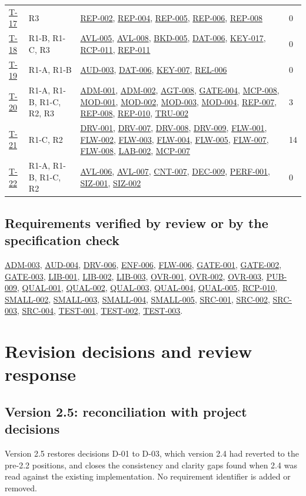 \documentclass[11pt,a4paper]{article}
\newcommand{\rr}[1]{\hyperlink{req:#1}{#1}}
\begin{document}
\begin{longtable}{@{}P{0.07\textwidth}P{0.10\textwidth}P{0.64\textwidth}P{0.08\textwidth}@{}}
\hyperlink{test:T-17}{T-17} & R3 & \rr{REP-002}, \rr{REP-004}, \rr{REP-005}, \rr{REP-006}, \rr{REP-008} & 0\\
\hyperlink{test:T-18}{T-18} & R1-B, R1-C, R3 & \rr{AVL-005}, \rr{AVL-008}, \rr{BKD-005}, \rr{DAT-006}, \rr{KEY-017}, \rr{RCP-011}, \rr{REP-011} & 0\\
\hyperlink{test:T-19}{T-19} & R1-A, R1-B & \rr{AUD-003}, \rr{DAT-006}, \rr{KEY-007}, \rr{REL-006} & 0\\
\hyperlink{test:T-20}{T-20} & R1-A, R1-B, R1-C, R2, R3 & \rr{ADM-001}, \rr{ADM-002}, \rr{AGT-008}, \rr{GATE-004}, \rr{MCP-008}, \rr{MOD-001}, \rr{MOD-002}, \rr{MOD-003}, \rr{MOD-004}, \rr{REP-007}, \rr{REP-008}, \rr{REP-010}, \rr{TRU-002} & 3\\
\hyperlink{test:T-21}{T-21} & R1-C, R2 & \rr{DRV-001}, \rr{DRV-007}, \rr{DRV-008}, \rr{DRV-009}, \rr{FLW-001}, \rr{FLW-002}, \rr{FLW-003}, \rr{FLW-004}, \rr{FLW-005}, \rr{FLW-007}, \rr{FLW-008}, \rr{LAB-002}, \rr{MCP-007} & 14\\
\hyperlink{test:T-22}{T-22} & R1-A, R1-B, R1-C, R2 & \rr{AVL-006}, \rr{AVL-007}, \rr{CNT-007}, \rr{DEC-009}, \rr{PERF-001}, \rr{SIZ-001}, \rr{SIZ-002} & 0\\
\bottomrule
\end{longtable}

\subsection*{Requirements verified by review or by the specification check}
\rr{ADM-003}, \rr{AUD-004}, \rr{DRV-006}, \rr{ENF-006}, \rr{FLW-006}, \rr{GATE-001}, \rr{GATE-002}, \rr{GATE-003}, \rr{LIB-001}, \rr{LIB-002}, \rr{LIB-003}, \rr{OVR-001}, \rr{OVR-002}, \rr{OVR-003}, \rr{PUB-009}, \rr{QUAL-001}, \rr{QUAL-002}, \rr{QUAL-003}, \rr{QUAL-004}, \rr{QUAL-005}, \rr{RCP-010}, \rr{SMALL-002}, \rr{SMALL-003}, \rr{SMALL-004}, \rr{SMALL-005}, \rr{SRC-001}, \rr{SRC-002}, \rr{SRC-003}, \rr{SRC-004}, \rr{TEST-001}, \rr{TEST-002}, \rr{TEST-003}.


\section{Revision decisions and review response}\label{app:review}
\subsection{Version 2.5: reconciliation with project decisions}
Version 2.5 restores decisions D-01 to D-03, which version 2.4 had reverted to the pre-2.2 positions, and closes the consistency and clarity gaps found when 2.4 was read against the existing implementation. No requirement identifier is added or removed.
\end{document}
